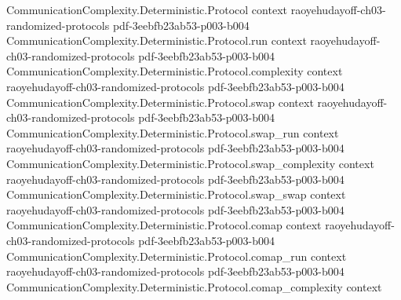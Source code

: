 \begin{theorem}
\label{CommunicationComplexity.PublicCoin.FiniteMessage.Protocol.exists_good_randomness}
\leanok
{}
\proofstep
  {CommunicationComplexity.Deterministic.Protocol}
  {context}
  {raoyehudayoff-ch03-randomized-protocols}
  {pdf-3eebfb23ab53-p003-b004}
\proofstep
  {CommunicationComplexity.Deterministic.Protocol.run}
  {context}
  {raoyehudayoff-ch03-randomized-protocols}
  {pdf-3eebfb23ab53-p003-b004}
\proofstep
  {CommunicationComplexity.Deterministic.Protocol.complexity}
  {context}
  {raoyehudayoff-ch03-randomized-protocols}
  {pdf-3eebfb23ab53-p003-b004}
\proofstep
  {CommunicationComplexity.Deterministic.Protocol.swap}
  {context}
  {raoyehudayoff-ch03-randomized-protocols}
  {pdf-3eebfb23ab53-p003-b004}
\proofstep
  {CommunicationComplexity.Deterministic.Protocol.swap_run}
  {context}
  {raoyehudayoff-ch03-randomized-protocols}
  {pdf-3eebfb23ab53-p003-b004}
\proofstep
  {CommunicationComplexity.Deterministic.Protocol.swap_complexity}
  {context}
  {raoyehudayoff-ch03-randomized-protocols}
  {pdf-3eebfb23ab53-p003-b004}
\proofstep
  {CommunicationComplexity.Deterministic.Protocol.swap_swap}
  {context}
  {raoyehudayoff-ch03-randomized-protocols}
  {pdf-3eebfb23ab53-p003-b004}
\proofstep
  {CommunicationComplexity.Deterministic.Protocol.comap}
  {context}
  {raoyehudayoff-ch03-randomized-protocols}
  {pdf-3eebfb23ab53-p003-b004}
\proofstep
  {CommunicationComplexity.Deterministic.Protocol.comap_run}
  {context}
  {raoyehudayoff-ch03-randomized-protocols}
  {pdf-3eebfb23ab53-p003-b004}
\proofstep
  {CommunicationComplexity.Deterministic.Protocol.comap_complexity}
  {context}

\end{theorem}
